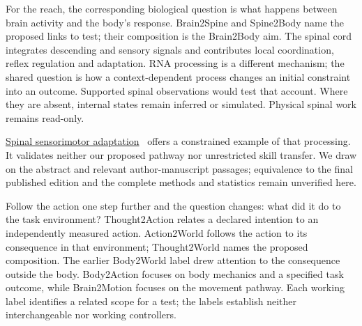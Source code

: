 For the reach, the corresponding biological question is what happens between
brain activity and the body's response. Brain2Spine and Spine2Body name the
proposed links to test; their composition is the Brain2Body aim. The spinal cord
integrates descending and sensory signals and contributes local coordination,
reflex regulation and adaptation. RNA processing is a different mechanism;
the shared question is how a context-dependent process changes an initial
constraint into an outcome. Supported spinal observations would test that
account. Where they are absent, internal states remain inferred or simulated.
Physical spinal work remains read-only.
\par\noindent \href{https://pubmed.ncbi.nlm.nih.gov/38603479/}{Spinal sensorimotor adaptation}~\cite{lavaud2024}
offers a constrained example of that processing. It validates neither our
proposed pathway nor unrestricted skill transfer. We draw on the abstract and
relevant author-manuscript passages; equivalence to the final published edition
and the complete methods and statistics remain unverified here.

Follow the action one step further and the question changes: what did it do
to the task environment? Thought2Action relates a declared intention to an
independently measured action. Action2World follows the action to its consequence
in that environment; Thought2World names the proposed composition. The earlier
Body2World label drew attention to the consequence outside the body. Body2Action
focuses on body mechanics and a specified task outcome, while Brain2Motion
focuses on the movement pathway. Each working label identifies a related scope
for a test; the labels establish neither interchangeable nor working controllers.

